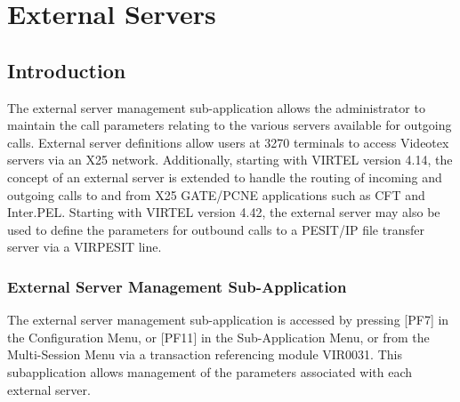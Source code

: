 \documentclass[letterpaper,10pt,english]{sphinxmanual}
\begin{document}
\ignorespaces 

\chapter{External Servers}
\label{\detokenize{connectivity_guide:external-servers}}\label{\detokenize{connectivity_guide:index-129}}

\section{Introduction}
\label{\detokenize{connectivity_guide:id66}}
The external server management sub-application allows the administrator to maintain the call parameters relating to the various servers available for outgoing calls. External server definitions allow users at 3270 terminals to access Videotex servers via an X25 network. Additionally, starting with VIRTEL version 4.14, the concept of an external server
is extended to handle the routing of incoming and outgoing calls to and from X25 GATE/PCNE applications such as CFT and Inter.PEL. Starting with VIRTEL version 4.42, the external server may also be used to define the parameters for outbound calls to a PESIT/IP file transfer server via a VIRPESIT line.

\ignorespaces 

\subsection{External Server Management Sub-Application}
\label{\detokenize{connectivity_guide:external-server-management-sub-application}}\label{\detokenize{connectivity_guide:index-130}}
The external server management sub-application is accessed by pressing {[}PF7{]} in the Configuration Menu, or {[}PF11{]} in the Sub-Application Menu, or from the Multi-Session Menu via a transaction referencing module VIR0031. This subapplication allows management of the parameters associated with each external server.

\ignorespaces 
\end{document}
